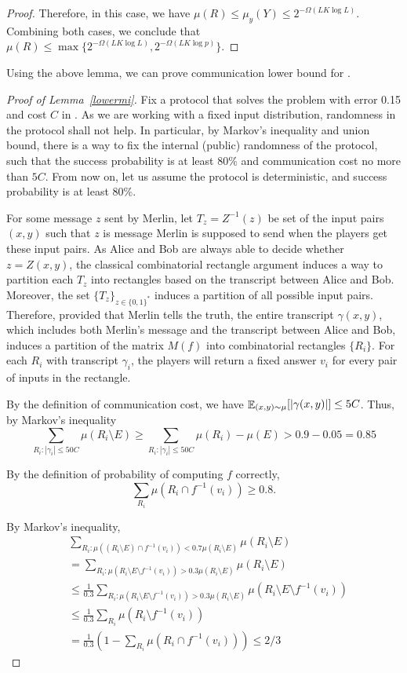 \documentclass[11pt]{article}
\begin{document}
{\begin{proof}
Therefore, in this case, we have $\mu(R)\leq \mu_y(Y)\leq 2^{-\Omega(LK\log L)}$. Combining both cases, we conclude that $\mu(R)\leq \max\{2^{-\Omega(LK\log L)},2^{-\Omega(LK\log p)}\}$. 
\end{proof}

Using the above lemma, we can prove communication lower bound for \mi{}.

\begin{proof}[Proof of Lemma~\ref{lowermi}]
Fix a protocol that solves the \mi{} problem with error 0.15 and cost $C$ in \mm{}. As we are working with a fixed input distribution, randomness in the protocol shall not help. In particular, by Markov's inequality and union bound, there is a way to fix the internal (public) randomness of the protocol, such that the success probability is at least $80\%$ and communication cost no more than $5C$. From now on, let us assume the protocol is deterministic, and success probability is at least $80\%$. 

For some message $z$ sent by Merlin, let $T_z=Z^{-1}(z)$ be set of the input pairs $(x,y)$ such that $z$ is message Merlin is supposed to send when the players get these input pairs. As Alice and Bob are always able to decide whether $z=Z(x, y)$, the classical combinatorial rectangle argument induces a way to partition each $T_z$ into rectangles based on the transcript between Alice and Bob. Moreover, the set $\{T_z\}_{z\in\{0,1\}^*}$ induces a partition of all possible input pairs. Therefore, provided that Merlin tells the truth, the entire transcript $\gamma(x, y)$, which includes both Merlin's message and the transcript between Alice and Bob, induces a partition of the matrix $M(f)$ into combinatorial rectangles $\{R_i\}$. For each $R_i$ with transcript $\gamma_i$, the players will return a fixed answer $v_i$ for every pair of inputs in the rectangle. 

By the definition of communication cost, we have $\mathop{\mathbb{E}}_{(x,y)\sim \mu}[|\gamma(x,y)|]\leq 5C$. Thus, by Markov's inequality
\begin{equation}\label{eqn1}
	\sum_{R_i:|\gamma_i|\leq 50C}\mu\left(R_i\setminus E\right)\geq \sum_{R_i:|\gamma_i|\leq 50C}\mu\left(R_i\right)-\mu(E)>0.9-0.05=0.85
\end{equation}

By the definition of probability of computing $f$ correctly, \[
\sum_{R_i}\mu(R_i\cap f^{-1}(v_i))\geq 0.8.
\]

By Markov's inequality, 
\[
\begin{aligned}
	&\sum_{R_i:\mu((R_i\setminus E)\cap f^{-1}(v_i))<0.7\mu(R_i\setminus E)}\mu(R_i\setminus E) \\
	&= \sum_{R_i:\mu(R_i\setminus E\setminus f^{-1}(v_i))>0.3\mu(R_i\setminus E)}\mu(R_i\setminus E) \\
	&\leq \frac{1}{0.3}\sum_{R_i:\mu(R_i\setminus E\setminus f^{-1}(v_i))>0.3\mu(R_i\setminus E)}\mu(R_i\setminus E\setminus f^{-1}(v_i)) \\
	&\leq \frac{1}{0.3}\sum_{R_i}\mu(R_i\setminus f^{-1}(v_i)) \\
	&=\frac{1}{0.3}\left(1-\sum_{R_i}\mu(R_i\cap f^{-1}(v_i))\right)\leq 2/3
\end{aligned}
\]


\end{proof}}
\end{document}
